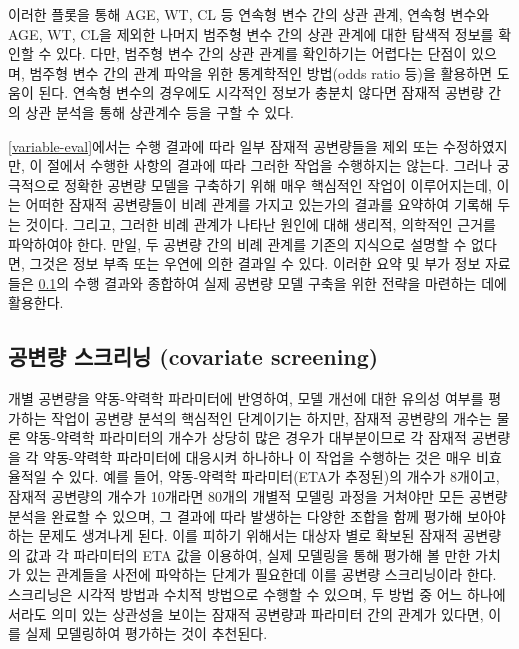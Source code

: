 \documentclass[
  11pt,
  krantz2, a4paper, twoside]{krantz}
\theoremstyle{definition}
\theoremstyle{definition}
\theoremstyle{definition}
\theoremstyle{remark}
\begin{document}
이러한 플롯을 통해 AGE, WT, CL 등 연속형 변수 간의 상관 관계, 연속형 변수와 AGE, WT, CL을 제외한 나머지 범주형 변수 간의 상관 관계에 대한 탐색적 정보를 확인할 수 있다. 다만, 범주형 변수 간의 상관 관계를 확인하기는 어렵다는 단점이 있으며, 범주형 변수 간의 관계 파악을 위한 통계학적인 방법(odds ratio 등)을 활용하면 도움이 된다. 연속형 변수의 경우에도 시각적인 정보가 충분치 않다면 잠재적 공변량 간의 상관 분석을 통해 상관계수 등을 구할 수 있다.

\ref{variable-eval}에서는 수행 결과에 따라 일부 잠재적 공변량들을 제외 또는 수정하였지만, 이 절에서 수행한 사항의 결과에 따라 그러한 작업을 수행하지는 않는다. 그러나 궁극적으로 정확한 공변량 모델을 구축하기 위해 매우 핵심적인 작업이 이루어지는데, 이는 어떠한 잠재적 공변량들이 비례 관계를 가지고 있는가의 결과를 요약하여 기록해 두는 것이다. 그리고, 그러한 비례 관계가 나타난 원인에 대해 생리적, 의학적인 근거를 파악하여야 한다. 만일, 두 공변량 간의 비례 관계를 기존의 지식으로 설명할 수 없다면, 그것은 정보 부족 또는 우연에 의한 결과일 수 있다. 이러한 요약 및 부가 정보 자료들은 \ref{cov-screening}의 수행 결과와 종합하여 실제 공변량 모델 구축을 위한 전략을 마련하는 데에 활용한다.

\hypertarget{cov-screening}{%
\subsection{공변량 스크리닝 (covariate screening)}\label{cov-screening}}

개별 공변량을 약동-약력학 파라미터에 반영하여, 모델 개선에 대한 유의성 여부를 평가하는 작업이 공변량 분석의 핵심적인 단계이기는 하지만, 잠재적 공변량의 개수는 물론 약동-약력학 파라미터의 개수가 상당히 많은 경우가 대부분이므로 각 잠재적 공변량을 각 약동-약력학 파라미터에 대응시켜 하나하나 이 작업을 수행하는 것은 매우 비효율적일 수 있다. 예를 들어, 약동-약력학 파라미터(ETA가 추정된)의 개수가 8개이고, 잠재적 공변량의 개수가 10개라면 80개의 개별적 모델링 과정을 거쳐야만 모든 공변량 분석을 완료할 수 있으며, 그 결과에 따라 발생하는 다양한 조합을 함께 평가해 보아야 하는 문제도 생겨나게 된다. 이를 피하기 위해서는 대상자 별로 확보된 잠재적 공변량의 값과 각 파라미터의 ETA 값을 이용하여, 실제 모델링을 통해 평가해 볼 만한 가치가 있는 관계들을 사전에 파악하는 단계가 필요한데 이를 공변량 스크리닝이라 한다. 스크리닝은 시각적 방법과 수치적 방법으로 수행할 수 있으며, 두 방법 중 어느 하나에서라도 의미 있는 상관성을 보이는 잠재적 공변량과 파라미터 간의 관계가 있다면, 이를 실제 모델링하여 평가하는 것이 추천된다.
\end{document}

